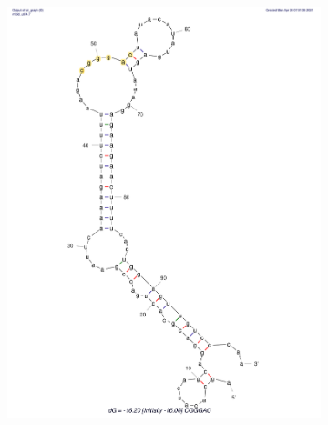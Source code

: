 \begin{figure}[!ht]
\begin{subfigure}[b]{0.49\textwidth}
        \includegraphics[scale=0.25]{plots/Supplementary/Structure_CGGGAC.pdf}
        \label{fig:CGGGAC}
    \end{subfigure}
    \hfill
    \begin{subfigure}[b]{0.49\textwidth}
        \centering

\end{subfigure}
\end{figure}

